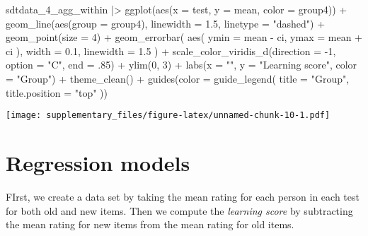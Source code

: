 \documentclass[
  man,floatsintext]{apa7}
\newenvironment{Shaded}{\begin{snugshade}}{\end{snugshade}}
\newcommand{\AttributeTok}[1]{\textcolor[rgb]{0.77,0.63,0.00}{#1}}
\newcommand{\DecValTok}[1]{\textcolor[rgb]{0.00,0.00,0.81}{#1}}
\newcommand{\FloatTok}[1]{\textcolor[rgb]{0.00,0.00,0.81}{#1}}
\newcommand{\FunctionTok}[1]{\textcolor[rgb]{0.00,0.00,0.00}{#1}}
\newcommand{\NormalTok}[1]{#1}
\newcommand{\SpecialCharTok}[1]{\textcolor[rgb]{0.00,0.00,0.00}{#1}}
\newcommand{\StringTok}[1]{\textcolor[rgb]{0.31,0.60,0.02}{#1}}
\begin{document}
\begin{Shaded}
\begin{Highlighting}[]
\NormalTok{sdtdata\_4\_agg\_within }\SpecialCharTok{|\textgreater{}}
  \FunctionTok{ggplot}\NormalTok{(}\FunctionTok{aes}\NormalTok{(}\AttributeTok{x =}\NormalTok{ test, }\AttributeTok{y =}\NormalTok{ mean, }\AttributeTok{color =}\NormalTok{ group4)) }\SpecialCharTok{+}
  \FunctionTok{geom\_line}\NormalTok{(}\FunctionTok{aes}\NormalTok{(}\AttributeTok{group =}\NormalTok{ group4), }\AttributeTok{linewidth =} \FloatTok{1.5}\NormalTok{, }\AttributeTok{linetype =} \StringTok{"dashed"}\NormalTok{) }\SpecialCharTok{+}
  \FunctionTok{geom\_point}\NormalTok{(}\AttributeTok{size =} \DecValTok{4}\NormalTok{) }\SpecialCharTok{+}
  \FunctionTok{geom\_errorbar}\NormalTok{(}
    \FunctionTok{aes}\NormalTok{(}
      \AttributeTok{ymin =}\NormalTok{ mean }\SpecialCharTok{{-}}\NormalTok{ ci,}
      \AttributeTok{ymax =}\NormalTok{ mean }\SpecialCharTok{+}\NormalTok{ ci}
\NormalTok{    ),}
    \AttributeTok{width =} \FloatTok{0.1}\NormalTok{, }\AttributeTok{linewidth =} \FloatTok{1.5}
\NormalTok{  ) }\SpecialCharTok{+}
  \FunctionTok{scale\_color\_viridis\_d}\NormalTok{(}\AttributeTok{direction =} \SpecialCharTok{{-}}\DecValTok{1}\NormalTok{, }\AttributeTok{option =} \StringTok{"C"}\NormalTok{, }\AttributeTok{end =}\NormalTok{ .}\DecValTok{85}\NormalTok{) }\SpecialCharTok{+}
  \FunctionTok{ylim}\NormalTok{(}\DecValTok{0}\NormalTok{, }\DecValTok{3}\NormalTok{) }\SpecialCharTok{+}
  \FunctionTok{labs}\NormalTok{(}\AttributeTok{x =} \StringTok{""}\NormalTok{, }\AttributeTok{y =} \StringTok{"Learning score"}\NormalTok{, }\AttributeTok{color =} \StringTok{"Group"}\NormalTok{) }\SpecialCharTok{+}
  \FunctionTok{theme\_clean}\NormalTok{() }\SpecialCharTok{+}
  \FunctionTok{guides}\NormalTok{(}\AttributeTok{color =} \FunctionTok{guide\_legend}\NormalTok{(}
    \AttributeTok{title =} \StringTok{"Group"}\NormalTok{,}
    \AttributeTok{title.position =} \StringTok{"top"}
\NormalTok{  ))}
\end{Highlighting}
\end{Shaded}

\texttt{[image: supplementary\_files/figure-latex/unnamed-chunk-10-1.pdf]}

\hypertarget{regression-models}{%
\section{Regression models}\label{regression-models}}

FIrst, we create a data set by taking the mean rating for each person in each test for both old and new items. Then we compute the \emph{learning score} by subtracting the mean rating for new items from the mean rating for old items.
\end{document}
